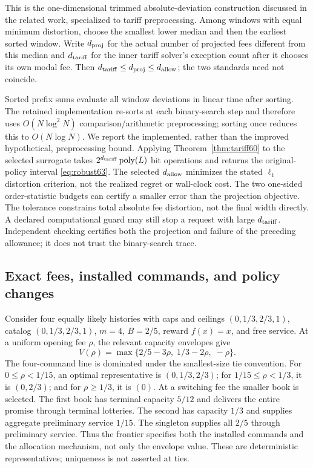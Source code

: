 \documentclass[11pt,letterpaper]{article}
\theoremstyle{definition}\newtheorem{remark}[theorem]{Remark}
\begin{document}
This is the one-dimensional trimmed absolute-deviation construction discussed in the related work, specialized to tariff preprocessing. Among windows with equal minimum distortion, choose the smallest lower median and then the earliest sorted window. Write $d_{\rm proj}$ for the actual number of projected fees different from this median and $d_{\rm tariff}$ for the inner tariff solver's exception count after it chooses its own modal fee. Then $d_{\rm tariff}\leq d_{\rm proj}\leq d_{\rm allow}$; the two standards need not coincide.

Sorted prefix sums evaluate all window deviations in linear time after sorting. The retained implementation re-sorts at each binary-search step and therefore uses $O(N\log^2 N)$ comparison/arithmetic preprocessing; sorting once reduces this to $O(N\log N)$. We report the implemented, rather than the improved hypothetical, preprocessing bound. Applying Theorem~\ref{thm:tariff60} to the selected surrogate takes $2^{d_{\rm tariff}}\operatorname{poly}(L)$ bit operations and returns the original-policy interval \eqref{eq:robust63}. The selected $d_{\rm allow}$ minimizes the stated $\ell_1$ distortion criterion, not the realized regret or wall-clock cost. The two one-sided order-statistic budgets can certify a smaller error than the projection objective. The tolerance constrains total absolute fee distortion, not the final width directly. A declared computational guard may still stop a request with large $d_{\rm tariff}$. Independent checking certifies both the projection and failure of the preceding allowance; it does not trust the binary-search trace.

\subsection{Exact fees, installed commands, and policy changes}\label{sec:frontier63}
Consider four equally likely histories with caps and ceilings $(0,1/3,2/3,1)$, catalog $(0,1/3,2/3,1)$, $m=4$, $B=2/5$, reward $f(x)=x$, and free service. At a uniform opening fee $\rho$, the relevant capacity envelopes give
\[
 V(\rho)=\max\{2/5-3\rho,\;1/3-2\rho,\;-\rho\}.
\]
The four-command line is dominated under the smallest-size tie convention. For $0\leq\rho<1/15$, an optimal representative is $(0,1/3,2/3)$; for $1/15\leq\rho<1/3$, it is $(0,2/3)$; and for $\rho\geq1/3$, it is $(0)$. At a switching fee the smaller book is selected. The first book has terminal capacity $5/12$ and delivers the entire promise through terminal lotteries. The second has capacity $1/3$ and supplies aggregate preliminary service $1/15$. The singleton supplies all $2/5$ through preliminary service. Thus the frontier specifies both the installed commands and the allocation mechanism, not only the envelope value. These are deterministic representatives; uniqueness is not asserted at ties.
\end{document}
